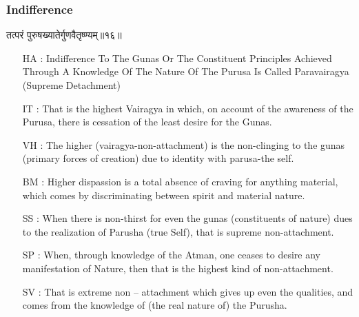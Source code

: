 \begin{frame}[fragile]\frametitle{Indifference}
\begin{sanskrit}
तत्परं पुरुषख्यातेर्गुणवैतृष्ण्यम्॥१६॥
\end{sanskrit}

	\begin{itemize}
	\item [HA]: Indifference To The Gunas Or The Constituent Principles Achieved Through A Knowledge Of The Nature Of The Purusa Is Called Paravairagya (Supreme Detachment)
	\item [IT]: That is the highest Vairagya in which, on account of the awareness of the Purusa, there is cessation of the least desire for the Gunas.
	\item [VH]: The higher (vairagya-non-attachment) is the non-clinging to the gunas (primary forces of creation) due to identity with parusa-the self.
	\item [BM]: Higher dispassion is a total absence of craving for anything material, which comes by discriminating between spirit and material nature.
	\item [SS]: When there is non-thirst for even the gunas (constituents of nature) dues to the realization of Parusha (true Self), that is supreme non-attachment.
	\item [SP]: When, through knowledge of the Atman, one ceases to desire any manifestation of Nature, then that is the highest kind of non-attachment.
	\item [SV]: That is extreme non – attachment which gives up even the qualities, and comes from the knowledge of (the real nature of) the Purusha. 
	\end{itemize}
\end{frame}



